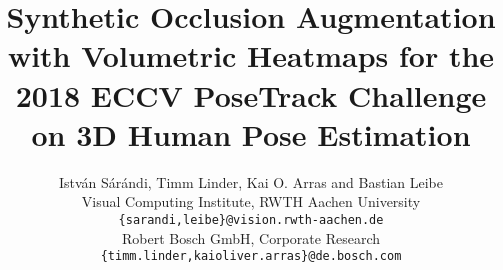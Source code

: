 \documentclass[10pt,twocolumn,letterpaper]{article}
\begin{document}
\newcommand{\partialderiv}[1]{\frac{\partial}{\partial #1}}
\newcommand{\partialfrac}[2]{\frac{\partial #1}{\partial #2}}
\newcommand{\deriv}[1]{\frac{\textnormal{d}}{\textnormal{d} #1}}
\newcommand{\derivfrac}[2]{\frac{\textnormal{d} #1}{\textnormal{d} #2}}
\newcommand{\half}{\nicefrac{1}{2}}
\newcommand{\veclen}[1]{\left\|#1\right\|}
\newcommand{\veccoords}[2]{
    \begin{pmatrix}
      #1 \\
      #2
    \end{pmatrix}
  }
  
\newcommand{\veccoordsthree}[3]{
    \begin{pmatrix}
      #1 \\
      #2 \\
      #3
    \end{pmatrix}
  }
  
\newcommand{\horizveccoords}[2]{
    \begin{pmatrix}
      #1 & #2
    \end{pmatrix}
  }

\newcommand{\floor}[1]{\lfloor #1\rfloor}  
\newcommand{\condprob}[2]{P\big(#1 \big| #2\big)}  
\newcommand{\prob}[1]{P\big(#1\big)}  

\newcommand{\at}[2]{\left.#1\right|_{#2}}
\newcommand{\newln}{\\&\quad\quad{}}
\newcommand{\tr}{^\top}
\newcommand{\inv}{^{-1}}
\newcommand{\reals}{\mathbb{R}}

\newcommand*\SetCond[2]{\left\{#1 \big| #2\right\}}
\newcommand*\Set[1]{\left\{#1\right\}}
\newcommand*\equ[1]{}
\newcommand*\abs[1]{\left|#1\right|}
\newcommand*\range[2]{\Set{#1,\ldots,#2}}
\newcommand*\varsupto[2]{#1_1,\ldots,#1_{#2}}
\newcommand*\upto[1]{\in\range{1}{#1}}

 \graphicspath{{images/}}

\title{Synthetic Occlusion Augmentation with Volumetric Heatmaps for the  \\ 2018 ECCV PoseTrack Challenge on 3D Human Pose Estimation}

\author{Istv\'{a}n S\'{a}r\'{a}ndi, Timm Linder, Kai O. Arras and Bastian Leibe\vspace{8pt}\\
Visual Computing Institute, RWTH Aachen University \\ {\tt\small \{sarandi,leibe\}@vision.rwth-aachen.de} \\
Robert Bosch GmbH, Corporate Research \\ {\tt\small \{timm.linder,kaioliver.arras\}@de.bosch.com}}
\end{document}
